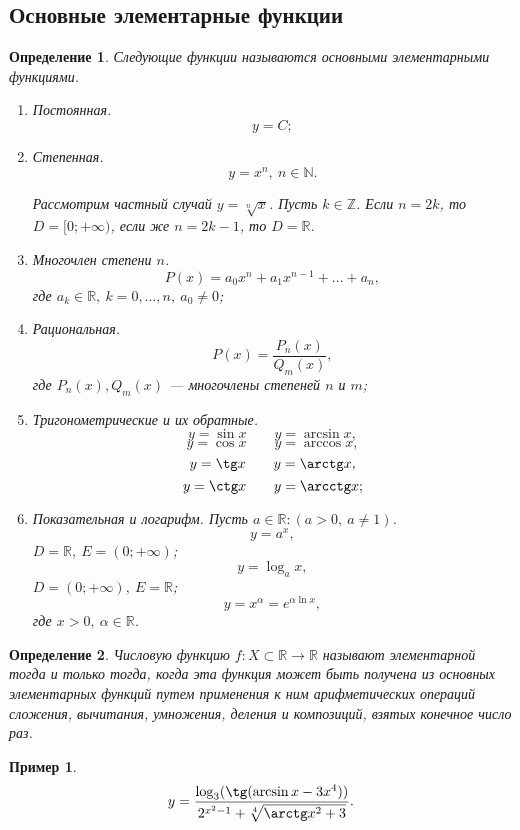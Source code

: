\documentclass[a4paper,12pt]{article} %
\newtheorem{definition}{Определение}[section]
\theoremstyle{remark}
\theoremstyle{definition}
\newtheorem{exmp}{Пример}[section]
\begin{document}
\subsection{Основные элементарные функции}
\begin{definition}
    Следующие функции называются основными элементарными функциями.
    \begin{enumerate}
        \item Постоянная. 
            \[y = C;\]
        \item Степенная. 
            \[y = x^{n}, \ n\in \mathbb{N}.\]

            Рассмотрим частный случай $y = \sqrt[n]{x}$. 
            Пусть $k\in \mathbb{Z}$. Если $n=2k$, то $D= [0; +\infty)$, если же $n = 2k -1$, то $D = \mathbb{R}$.
        \item Многочлен степени $n$. 
            \[P(x) = a_0x^{n} + a_1x^{n-1}+\ldots+a_n,\]
            где $a_k \in \mathbb{R}, \ k = 0,\ldots,n, \ a_0 \neq 0$;
        \item Рациональная. 
            \[P(x) = \frac{P_n(x)}{Q_m(x)},\]
            где $P_n(x), Q_m(x)$ --- многочлены степеней $n$ и $m$;
        \item Тригонометрические и их обратные.
            \[y = \sin x \quad \quad y = \arcsin x,\] 
            \[y = \cos x \quad \quad y = \arccos x,\] 
            \[y = \tg x  \quad \quad y = \arctg x,\] 
            \[y = \ctg x \quad \quad y = \arcctg x;\] 
        \item Показательная и логарифм. Пусть $a\in \mathbb{R} : (a > 0, \ a \neq 1)$.
            \[y = a^{x},\] 
            $D = \mathbb{R}, \ E = (0;+\infty)$;
            \[y = \log_a x,\] 
            $D = (0; +\infty), \ E = \mathbb{R}$;
            \[y = x^{\alpha} = e^{\alpha\ln x},\] 
            где $x > 0, \ \alpha \in \mathbb{R}$.
    \end{enumerate}
\end{definition}

\begin{definition}
    Числовую функцию $f : X\subset \mathbb{R} \to \mathbb{R}$ называют элементарной тогда и только тогда,
    когда эта функция может быть получена из основных элементарных функций путем применения к ним арифметических
    операций сложения, вычитания, умножения, деления и композиций, взятых конечное число раз.
\end{definition}
\begin{exmp}
    \[y = \frac{\log_3 (\tg(\arcsin x - 3x^{4}))}{2^{x^2-1} + \sqrt[4]{\arctg x^2 + 3}}.\] 
\end{exmp}
\end{document}
